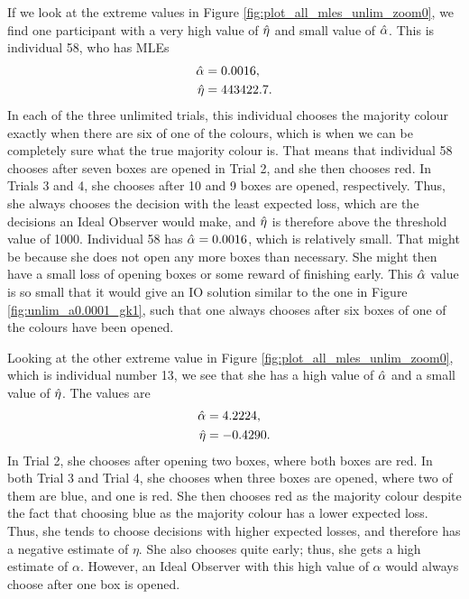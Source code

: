  
If we look at the extreme values in Figure \ref{fig:plot_all_mles_unlim_zoom0}, we find one participant with a very high value of $\hat{\eta}$ and small value of $\hat{\alpha}$. This is individual 58, who has MLEs
\begin{equation}
\label{mles_unlim_person58}
    \begin{aligned}
        \hat{\alpha} &= 0.0016,\\
        \hat{\eta} &= 443422.7.
    \end{aligned}
\end{equation}
In each of the three unlimited trials, this individual chooses the majority colour exactly when there are six of one of the colours, which is when we can be completely sure what the true majority colour is. That means that individual 58 chooses after seven boxes are opened in Trial 2, and she then chooses red. In Trials 3 and 4, she chooses after 10 and 9 boxes are opened, respectively. Thus, she always chooses the decision with the least expected loss, which are the decisions an Ideal Observer would make, and $\hat{\eta}$ is therefore above the threshold value of 1000. Individual 58 has $\hat{\alpha}=0.0016$, which is relatively small. That might be because she does not open any more boxes than necessary. She might then have a small loss of opening boxes or some reward of finishing early. This $\hat{\alpha}$ value is so small that it would give an IO solution similar to the one in Figure \ref{fig:unlim_a0.0001_gk1}, such that one always chooses after six boxes of one of the colours have been opened. 



Looking at the other extreme value in Figure \ref{fig:plot_all_mles_unlim_zoom0}, which is individual number 13, we see that she has a high value of $\hat{\alpha}$ and a small value of $\hat{\eta}$. The values are
\begin{equation}
\label{mles_unlim_person13}
    \begin{aligned}
        \hat{\alpha} &= 4.2224,\\
        \hat{\eta} &= -0.4290.
    \end{aligned}
\end{equation}
In Trial 2, she chooses after opening two boxes, where both boxes are red. In both Trial 3 and Trial 4, she chooses when three boxes are opened, where two of them are blue, and one is red. She then chooses red as the majority colour despite the fact that choosing blue as the majority colour has a lower expected loss. Thus, she tends to choose decisions with higher expected losses, and therefore has a negative estimate of $\eta$. She also chooses quite early; thus, she gets a high estimate of $\alpha$. However, an Ideal Observer with this high value of $\alpha$ would always choose after one box is opened.


